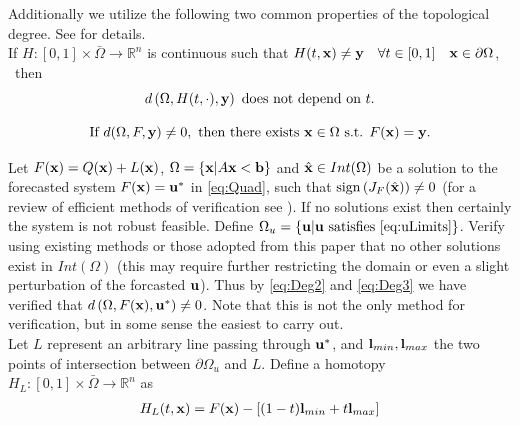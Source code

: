 \documentclass[11pt]{article}
\theoremstyle{plain}
\theoremstyle{definition}
\theoremstyle{remark}
\begin{document}
Additionally we utilize the following two common properties of the topological degree. 
See \cite{OrChCh2006} for details. \\
If $H : [0,1]\times\bar{\Omega}\rightarrow\mathbb{R}^n$ is continuous such that $H(t,\bold x)\neq \bold y \quad \forall t\in[0,1]\quad \bold x\in\partial\Omega$,   \ then 
\begin{equation}\label{eq:Deg1} 
d\left(\Omega,H(t,\cdot),\bold y\right)\text{ does not depend on }t.
\end{equation}

\begin{equation}\label{eq:Deg2}
\text{If }d(\Omega,F,\bold y)\neq 0,\text{ then there exists }\bold x\in\Omega\text{ s.t. }F(\bold x)=\bold y. 
\end{equation}


Let $F(\bold x)=Q(\bold x)+L(\bold x)$, $\Omega=\{\bold x| A\bold x< \bold b\}$ and $\hat{\bold x}\in Int(\Omega)$ be a solution to the forecasted system $F(\bold x)=\bold u^*$ in \ref{eq:Quad}, such that $\operatorname{sign}\left(J_{F}(\hat{\bold x})\right)\neq 0$ (for a review of efficient methods of verification see \cite{GRIEWANK2014}). 
If no solutions exist then certainly the system is not robust feasible. Define $\Omega_u=\{\bold u| \bold u\text{ satisfies }\ref{eq:uLimits}\}$.
Verify using existing methods or those adopted from this paper that no other solutions exist in $Int(\Omega)$ (this may require further restricting the domain or even a slight perturbation of the forcasted $\bold u$). 
Thus by \ref{eq:Deg2} and \ref{eq:Deg3} we have verified that $d\left(\Omega, F(\bold x), \bold u^*\right)\neq 0$. 
Note that this is not the only method for verification, but in some sense the easiest to carry out. \\

Let $L$ represent an arbitrary line passing through $\bold u^*$, and $\bold l_{min},\bold l_{max}$ the two points of intersection between $\partial\Omega_u$ and $L$. 
Define a homotopy $H_L : [0,1]\times\bar{\Omega}\rightarrow\mathbb{R}^n$ as 
\begin{align}
H_L(t,\bold x) = F(\bold x)-\left[(1-t)\bold l_{min}+t\bold l_{max}\right] \label{eq:Homo}
\end{align}
\end{document}

